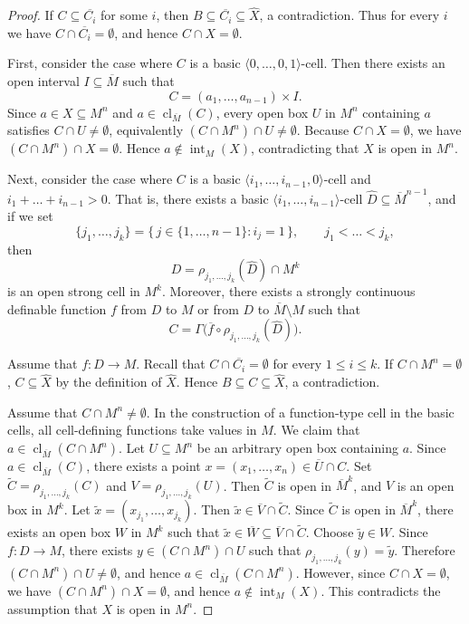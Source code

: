 \documentclass{amsart}
\theoremstyle{definition}
\theoremstyle{plain}
\DeclareMathOperator{\Int}{int}
\DeclareMathOperator{\cl}{cl}
\begin{document}
\begin{proof}
	If $C \subseteq \overline{C_i}$ for some $i$, then $B \subseteq \overline{C_i} \subseteq \hat{X}$, a contradiction.
	Thus for every $i$ we have $C \cap \overline{C_i} = \emptyset$, and hence $C \cap X = \emptyset$.
	
	First, consider the case where $C$ is a basic $\langle 0,\dots,0,1 \rangle$-cell.
	Then there exists an open interval $I \subseteq \overline{M}$ such that
	\[
	C = (a_1,\dots,a_{n-1}) \times I.
	\]
	Since $a \in X \subseteq M^n$ and $a \in \cl_{\overline{M}}(C)$, every open box $U$ in $M^n$ containing $a$ satisfies
	$C \cap U \ne \emptyset$, equivalently $(C \cap M^n) \cap U \ne \emptyset$.
	Because $C \cap X = \emptyset$, we have $(C \cap M^n) \cap X = \emptyset$.
	Hence $a \notin \Int_M(X)$, contradicting that $X$ is open in $M^n$.
	
	Next, consider the case where $C$ is a basic $\langle i_1,\dots,i_{n-1},0 \rangle$-cell and $i_1+\dots+i_{n-1} > 0$.
	That is, there exists a basic $\langle i_1,\dots,i_{n-1} \rangle$-cell $\hat{D} \subseteq \overline{M}^{n-1}$, and if we set
	\[
	\{j_1,\ldots,j_k\} = \{\, j \in \{1,\dots,n-1\} : i_j = 1 \,\},
	\qquad j_1 < \dots < j_k,
	\]
	then
	\[
	D = \rho_{j_1,\ldots,j_k}(\hat{D}) \cap M^k
	\]
	is an open strong cell in $M^k$.
	Moreover, there exists a strongly continuous definable function $f$ from $D$ to $M$ or from $D$ to $\overline{M}\setminus M$ such that
	\[
	C = \Gamma\bigl(\overline{f} \circ \rho_{j_1,\ldots,j_k}(\hat{D})\bigr).
	\]
	
	Assume that $f:D\to M$.
	Recall that $C \cap \overline{C_i} = \emptyset$ for every $1 \leq i \leq k$.
	If $C \cap M^n = \emptyset$, $C \subseteq \hat{X}$ by the definition of $\hat{X}$.
	Hence $B \subseteq C \subseteq \hat{X}$, a contradiction.
	
	Assume that $C \cap M^n \ne \emptyset$.
	In the construction of a function-type cell in the basic cells, all cell-defining functions take values in $M$.
	We claim that $a \in \cl_{\overline{M}}(C \cap M^n)$.
	Let $U \subseteq M^n$ be an arbitrary open box containing $a$.
	Since $a \in \cl_{\overline{M}}(C)$, there exists a point $x=(x_1,\dots,x_n) \in \overline{U} \cap C$.
	Set $\tilde{C} = \rho_{j_1,\ldots,j_k}(C)$ and $V = \rho_{j_1,\ldots,j_k}(U)$.
	Then $\tilde{C}$ is open in $\overline{M}^k$, and $V$ is an open box in $M^k$.
	Let $\tilde{x} = (x_{j_1},\dots,x_{j_k})$.
	Then $\tilde{x} \in \overline{V} \cap \tilde{C}$.
	Since $\tilde{C}$ is open in $\overline{M}^k$, there exists an open box $W$ in $M^k$ such that
	$\tilde{x} \in \overline{W} \subseteq \overline{V} \cap \tilde{C}$.
	Choose $\tilde{y} \in W$.
	Since $f:D\to M$, there exists $y \in (C \cap M^n) \cap U$ such that $\rho_{j_1,\ldots,j_k}(y) = \tilde{y}$.
	Therefore $(C \cap M^n) \cap U \ne \emptyset$, and hence $a \in \cl_{\overline{M}}(C \cap M^n)$.
	However, since $C \cap X = \emptyset$, we have $(C \cap M^n) \cap X = \emptyset$, and hence $a \notin \Int_M(X)$.
	This contradicts the assumption that $X$ is open in $M^n$.
	

\end{proof}
\end{document}
